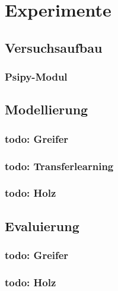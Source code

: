 \listoftodos


\chapter{Experimente}
\label{chap:Experimente}

	\section{Versuchsaufbau}
	\label{sec:Versuchsaufbau}
			\subsection{Psipy-Modul}
	
	\section{Modellierung}
	\label{sec:Modeling}
			\subsection{todo: Greifer }
			\subsection{todo: Transferlearning}
			\subsection{todo: Holz}
			
	\section{Evaluierung}
	\label{sec:Evaluierung}
		\subsection{todo: Greifer}
		\subsection{todo: Holz}